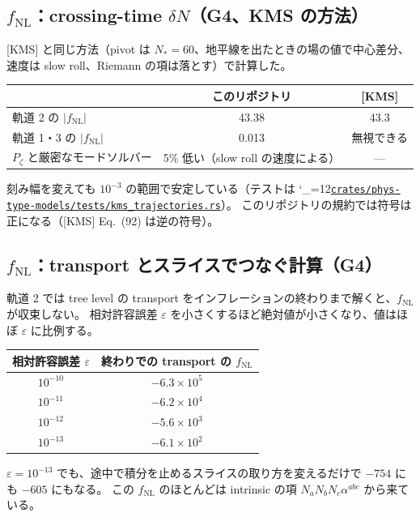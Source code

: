 \documentclass[a4paper,11pt]{ltjsarticle}
\newcommand{\fnl}{f_{\mathrm{NL}}}
\newcommand{\repourl}{https://github.com/inuverse44/phys-type-dev}
\newcommand{\reporev}{b1fea87}
\newcommand{\repo}{\begingroup\catcode`\_=12\relax\repoaux}
\newcommand{\repoaux}[1]{\href{\repourl/blob/\reporev/#1}{\nolinkurl{#1}}\endgroup}
\begin{document}
\subsection{\texorpdfstring{$\fnl$：crossing-time $\delta N$}{fNL：crossing-time δN}（G4、KMS の方法）}

[KMS] と同じ方法（pivot は $N_*=60$、地平線を出たときの場の値で中心差分、速度は slow roll、Riemann の項は落とす）で計算した。
\begin{center}
\begin{tabular}{lcc}
\toprule
 & このリポジトリ & [KMS] \\
\midrule
軌道 2 の $|\fnl|$ & 43.38 & 43.3 \\
軌道 1・3 の $|\fnl|$ & 0.013 & 無視できる \\
$P_\zeta$ と厳密なモードソルバー & 5\% 低い（slow roll の速度による） & --- \\
\bottomrule
\end{tabular}
\end{center}
刻み幅を変えても $10^{-3}$ の範囲で安定している（テストは \repo{crates/phys-type-models/tests/kms_trajectories.rs}）。
このリポジトリの規約では符号は正になる（[KMS] Eq.~(92) は逆の符号）。

\subsection{\texorpdfstring{$\fnl$}{fNL}：transport とスライスでつなぐ計算（G4）}
\label{sec:kms-transport}

軌道 2 では tree level の transport をインフレーションの終わりまで解くと、$\fnl$ が収束しない。
相対許容誤差 $\varepsilon$ を小さくするほど絶対値が小さくなり、値はほぼ $\varepsilon$ に比例する。
\begin{center}
\begin{tabular}{cc}
\toprule
相対許容誤差 $\varepsilon$ & 終わりでの transport の $\fnl$ \\
\midrule
$10^{-10}$ & $-6.3\times10^5$ \\
$10^{-11}$ & $-6.2\times10^4$ \\
$10^{-12}$ & $-5.6\times10^3$ \\
$10^{-13}$ & $-6.1\times10^2$ \\
\bottomrule
\end{tabular}
\end{center}
$\varepsilon=10^{-13}$ でも、途中で積分を止めるスライスの取り方を変えるだけで $-754$ にも $-605$ にもなる。
この $\fnl$ のほとんどは intrinsic の項 $N_aN_bN_c\alpha^{abc}$ から来ている。
\end{document}
